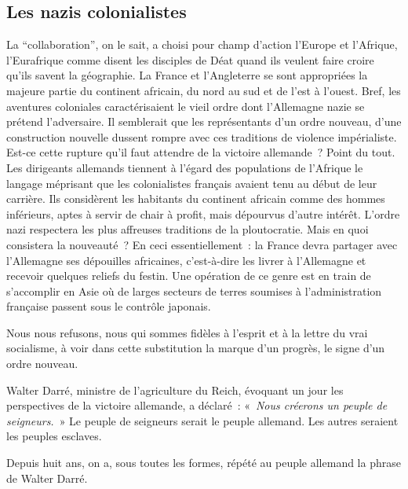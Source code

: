 \documentclass[french,twoside]{book} %
\begin{document}
\subsection[Les nazis colonialistes]{Les nazis colonialistes}
\noindent La “collaboration”, on le sait, a choisi pour champ d’action l’Europe et l’Afrique, l’Eurafrique comme disent les disciples de Déat quand ils veulent faire croire qu’ils savent la géographie. La France et l’Angleterre se sont appropriées la majeure partie du continent africain, du nord au sud et de l’est à l’ouest. Bref, les aventures coloniales caractérisaient le vieil ordre dont l’Allemagne nazie se prétend l’adversaire. Il semblerait que les représentants d’un ordre nouveau, d’une construction nouvelle dussent rompre avec ces traditions de violence impérialiste. Est-ce cette rupture qu’il faut attendre de la victoire allemande ? Point du tout. Les dirigeants allemands tiennent à l’égard des populations de l’Afrique le langage méprisant que les colonialistes français avaient tenu au début de leur carrière. Ils considèrent les habitants du continent africain comme des hommes inférieurs, aptes à servir de chair à profit, mais dépourvus d’autre intérêt. L’ordre nazi respectera les plus affreuses traditions de la ploutocratie. Mais en quoi consistera la nouveauté ? En ceci essentiellement : la France devra partager avec l’Allemagne ses dépouilles africaines, c’est-à-dire les livrer à l’Allemagne et recevoir quelques reliefs du festin. Une opération de ce genre est en train de s’accomplir en Asie où de larges secteurs de terres soumises à l’administration française passent sous le contrôle japonais.\par
Nous nous refusons, nous qui sommes fidèles à l’esprit et à la lettre du vrai socialisme, à voir dans cette substitution la marque d’un progrès, le signe d’un ordre nouveau.\par
Walter Darré, ministre de l’agriculture du Reich, évoquant un jour les perspectives de la victoire allemande, a déclaré : « \emph{Nous créerons un peuple de seigneurs.} » Le peuple de seigneurs serait le peuple allemand. Les autres seraient les peuples esclaves.\par
Depuis huit ans, on a, sous toutes les formes, répété au peuple allemand la phrase de Walter Darré.
\end{document}

